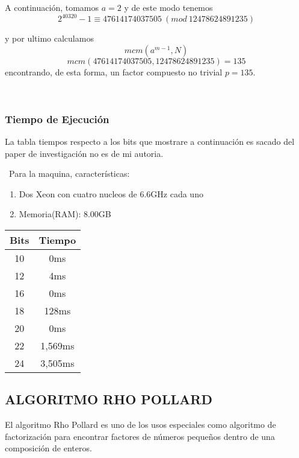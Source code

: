 \documentclass[11pt, conference]{IEEEtran}
\begin{document}
A continuación, tomamos $a=2$ y de este modo tenemos
\[2^{40320}-1\equiv 47614174037505\ (mod\ 12478624891235)\]

y por ultimo calculamos
\[mcm(a^{m-1}, N)\]
\[mcm(47614174037505, 12478624891235) = 135\]
encontrando, de esta forma, un factor compuesto no trivial $p=135$.

\

\subsubsection[Tiempo de Ejecución]{\textbf{Tiempo de Ejecución}}
La tabla tiempos respecto a los bits que mostrare a continuación es sacado del paper de investigación no es de mi autoria. 
\cite{a}

\
Para la maquina, características:
\begin{enumerate}
	\item Dos Xeon con cuatro nucleos de 6.6GHz cada uno
	\item Memoria(RAM): 8.00GB
\end{enumerate}
\begin{table}[htb]
	\begin{center}
		\begin{tabular}{|c|c|}
			\hline
			Bits&Tiempo\\
			\hline
			10&0ms\\
			\hline
			12&4ms\\
			\hline
			16&0ms\\
			\hline
			18&128ms\\
			\hline
			20&0ms\\
			\hline
			22&1,569ms\\
			\hline
			24&3,505ms\\
			\hline
		\end{tabular}
	\end{center}
\end{table}
\pagebreak









\subsection[Algoritmo Rho Pollard]{\textbf{ALGORITMO RHO POLLARD}}
\cite{b}\cite{c}El algoritmo Rho Pollard es uno de los usos especiales como algoritmo de factorización para encontrar factores de números pequeños dentro de una composición de enteros.\cite{d}\cite{e}
\end{document}
